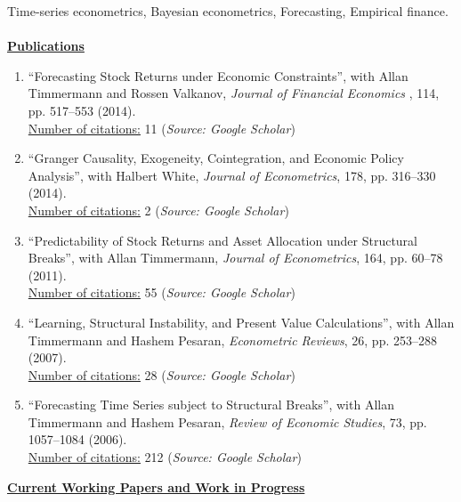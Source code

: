 \documentclass[12pt]{article}
\begin{document}
Time-series econometrics, Bayesian econometrics, Forecasting, Empirical finance.\\ \\
\underline{\textbf{Publications}}
\begin{enumerate}	
	\item ``Forecasting Stock Returns under Economic Constraints'', with Allan Timmermann and Rossen Valkanov, \emph{Journal of Financial Economics} , 114, pp. 517--553 (2014). \\
	\underline{Number of citations:} 11 (\emph{Source: Google Scholar})
	
	\item ``Granger Causality, Exogeneity, Cointegration, and Economic Policy Analysis'', with Halbert White, \emph{Journal of Econometrics}, 178, pp. 316--330 (2014). \\
	\underline{Number of citations:} 2 (\emph{Source: Google Scholar})
	
	\item ``Predictability of Stock Returns and Asset Allocation under Structural Breaks'', with Allan Timmermann, \emph{Journal of Econometrics}, 164, pp. 60--78 (2011). \\
	\underline{Number of citations:} 55 (\emph{Source: Google Scholar})
	
	\item ``Learning, Structural Instability, and Present Value Calculations'', with Allan Timmermann and Hashem Pesaran, \emph{Econometric Reviews}, 26, pp. 253--288 (2007). \\
	\underline{Number of citations:} 28 (\emph{Source: Google Scholar})

	\item ``Forecasting Time Series subject to Structural Breaks'', with Allan Timmermann and Hashem Pesaran, \emph{Review of Economic Studies}, 73, pp. 1057--1084 (2006). \\
	\underline{Number of citations:} 212 (\emph{Source: Google Scholar})

    \setcounter{enumTemp}{\theenumi}
 \end{enumerate}
\underline{\textbf{Current Working Papers and Work in Progress}}
\end{document}
